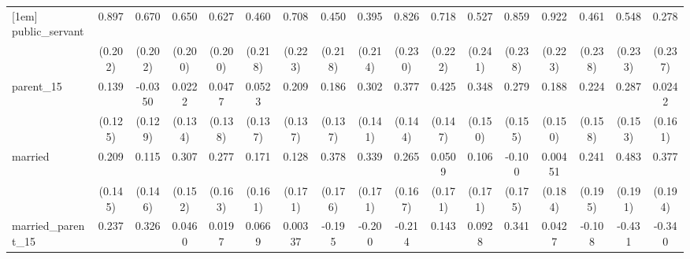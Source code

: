 {\begin{tabular}{l*{16}{c}}
[1em]
public\_servant      &       0.897\sym{***}&       0.670\sym{***}&       0.650\sym{**} &       0.627\sym{**} &       0.460\sym{*}  &       0.708\sym{**} &       0.450\sym{*}  &       0.395         &       0.826\sym{***}&       0.718\sym{**} &       0.527\sym{*}  &       0.859\sym{***}&       0.922\sym{***}&       0.461         &       0.548\sym{*}  &       0.278         \\
                    &     (0.202)         &     (0.202)         &     (0.200)         &     (0.200)         &     (0.218)         &     (0.223)         &     (0.218)         &     (0.214)         &     (0.230)         &     (0.222)         &     (0.241)         &     (0.238)         &     (0.223)         &     (0.238)         &     (0.233)         &     (0.237)         \\
[1em]
parent\_15           &       0.139         &     -0.0350         &      0.0222         &      0.0477         &      0.0523         &       0.209         &       0.186         &       0.302\sym{*}  &       0.377\sym{**} &       0.425\sym{**} &       0.348\sym{*}  &       0.279         &       0.188         &       0.224         &       0.287         &      0.0242         \\
                    &     (0.125)         &     (0.129)         &     (0.134)         &     (0.138)         &     (0.137)         &     (0.137)         &     (0.137)         &     (0.141)         &     (0.144)         &     (0.147)         &     (0.150)         &     (0.155)         &     (0.150)         &     (0.158)         &     (0.153)         &     (0.161)         \\
[1em]
married             &       0.209         &       0.115         &       0.307\sym{*}  &       0.277         &       0.171         &       0.128         &       0.378\sym{*}  &       0.339\sym{*}  &       0.265         &      0.0509         &       0.106         &      -0.100         &     0.00451         &       0.241         &       0.483\sym{*}  &       0.377         \\
                    &     (0.145)         &     (0.146)         &     (0.152)         &     (0.163)         &     (0.161)         &     (0.171)         &     (0.176)         &     (0.171)         &     (0.167)         &     (0.171)         &     (0.171)         &     (0.175)         &     (0.184)         &     (0.195)         &     (0.191)         &     (0.194)         \\
[1em]
married\_parent\_15   &       0.237         &       0.326         &      0.0460         &      0.0197         &      0.0669         &     0.00337         &      -0.195         &      -0.200         &      -0.214         &       0.143         &      0.0928         &       0.341         &      0.0427         &      -0.108         &      -0.431         &      -0.340         \\

\end{tabular}}
